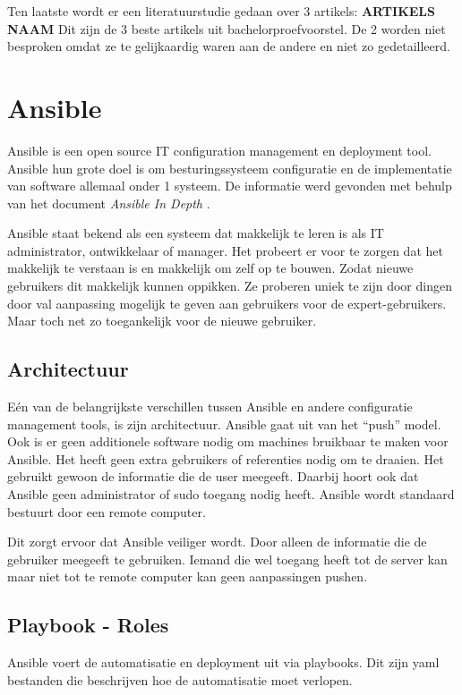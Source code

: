 Ten laatste wordt er een literatuurstudie gedaan over 3 artikels: \textbf{ARTIKELS NAAM} Dit zijn de 3 beste artikels uit bachelorproefvoorstel. De 2 worden niet besproken omdat ze te gelijkaardig waren aan de andere en niet zo gedetailleerd.

\section{Ansible}
Ansible is een open source IT configuration management en deployment tool. Ansible hun grote doel is om besturingssysteem configuratie en de implementatie van software allemaal onder 1 systeem. De informatie werd gevonden met behulp van het document \textit{Ansible In Depth} \autocite{ansibleid}.

Ansible staat bekend als een systeem dat makkelijk te leren is als IT administrator, ontwikkelaar of manager. Het probeert er voor te zorgen dat het makkelijk te verstaan is en makkelijk om zelf op te bouwen. Zodat nieuwe gebruikers dit makkelijk kunnen oppikken. Ze proberen uniek te zijn door dingen door val aanpassing mogelijk te geven aan gebruikers voor de expert-gebruikers. Maar toch net zo toegankelijk voor de nieuwe gebruiker.

\subsection{Architectuur}
Eén van de belangrijkste verschillen tussen Ansible en andere configuratie management tools, is zijn architectuur. Ansible gaat uit van het ``push'' model. Ook is er geen additionele software nodig om machines bruikbaar te maken voor Ansible. Het heeft geen extra gebruikers of referenties nodig om te draaien. Het gebruikt gewoon de informatie die de user meegeeft. Daarbij hoort ook dat Ansible geen administrator of sudo toegang nodig heeft. Ansible wordt standaard bestuurt door een remote computer.

Dit zorgt ervoor dat Ansible veiliger wordt. Door alleen de informatie die de gebruiker meegeeft te gebruiken. Iemand die wel toegang heeft tot de server kan maar niet tot te remote computer kan geen aanpassingen pushen.

\subsection{Playbook - Roles}
Ansible voert de automatisatie en deployment uit via playbooks. Dit zijn yaml bestanden die beschrijven hoe de automatisatie moet verlopen. 

